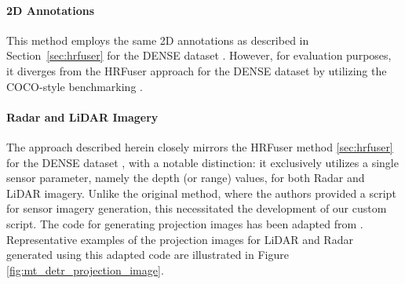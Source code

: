 \documentclass[report.tex]{subfiles}
\begin{document}
    \paragraph*{2D Annotations}

    This method employs the same 2D annotations as described in Section~\ref{sec:hrfuser} for the DENSE dataset \cite{bijelic2020seeing}. However, for evaluation purposes, it diverges from the HRFuser approach for the DENSE dataset \cite{bijelic2020seeing} by utilizing the COCO-style benchmarking \cite{lin2014microsoft}.

    \paragraph*{Radar and LiDAR Imagery}


    The approach described herein closely mirrors the HRFuser method \ref{sec:hrfuser} for the DENSE dataset \cite{bijelic2020seeing}, with a notable distinction: it exclusively utilizes a single sensor parameter, namely the depth (or range) values, for both Radar and LiDAR imagery. Unlike the original method, where the authors provided a script for sensor imagery generation, this necessitated the development of our custom script. The code for generating projection images has been adapted from \cite{bijelic2020seeing}. Representative examples of the projection images for LiDAR and Radar generated using this adapted code are illustrated in Figure \ref{fig:mt_detr_projection_image}.
\end{document}
